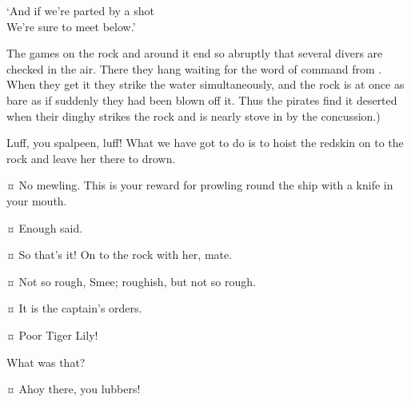 \begin{drama}
\begin{stagedir}
\begin{drama}
\speakercontinues
	‘And if we’re parted by a shot\\
	We’re sure to meet below.’
\end{drama}

The games on the rock and around it end so abruptly that several divers are checked in the air.
There they hang waiting for the word of command from \peter.
When they get it they strike the water simultaneously, and the rock is at once as bare as if suddenly they had been blown off it.
Thus the pirates find it deserted when their dinghy strikes the rock and is nearly stove in by the concussion.)
\end{stagedir}

\smeespeaks
Luff, you spalpeen, luff!
What we have got to do is to hoist the redskin on to the rock and leave her there to drown.


\starkeyspeaks {}¤
No mewling.
This is your reward for prowling round the ship with a knife in your mouth.

\tigerlilyspeaks {}¤
Enough said.

\smeespeaks {}¤
So that’s it!
On to the rock with her, mate.

\starkeyspeaks {}¤
Not so rough, Smee; roughish, but not so rough.

\smeespeaks {}¤
It is the captain’s orders.


\wendyspeaks {}¤
Poor Tiger Lily!

\starkeyspeaks
What was that?

\peterspeaks {}¤
Ahoy there, you lubbers!


\end{drama}
